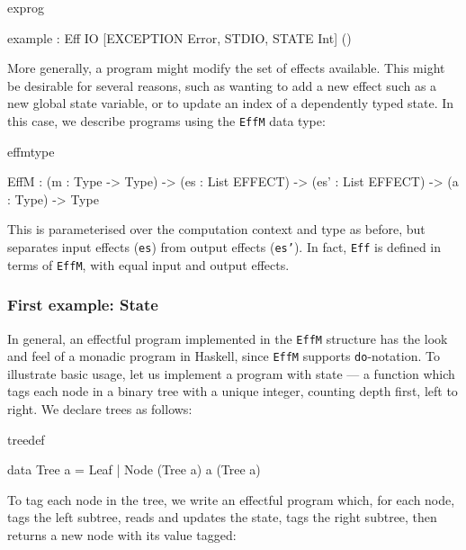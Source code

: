 \noindent
\begin{SaveVerbatim}{exprog}

 example : Eff IO [EXCEPTION Error, STDIO, STATE Int] ()

\end{SaveVerbatim}

More generally, a program might modify the set of effects available. This
might be desirable for several reasons, such as wanting to add a new effect
such as a new global state variable, or to update an index of a dependently
typed state. In this case, we describe programs using the \texttt{EffM}
data type:

\begin{SaveVerbatim}{effmtype}

EffM : (m   : Type -> Type) -> 
       (es  : List EFFECT) -> 
       (es' : List EFFECT) -> 
       (a   : Type) -> Type

\end{SaveVerbatim}

\noindent
This is parameterised over the computation context and type as before, but
separates input effects (\texttt{es}) from output effects (\texttt{es'}).
In fact, \texttt{Eff} is defined in terms of \texttt{EffM}, with equal input
and output effects.

\subsubsection{First example: State}

In general, an effectful program implemented in the \texttt{EffM} structure has
the look and feel of a monadic program in Haskell, since \texttt{EffM} supports
\texttt{do}-notation. To illustrate basic usage, let us implement
a program with state --- a function which tags each node in a binary tree with
a unique integer, counting depth first, left to right. We declare trees as
follows:

\begin{SaveVerbatim}{treedef}

data Tree a = Leaf 
            | Node (Tree a) a (Tree a)

\end{SaveVerbatim}

\noindent
To tag each node in the tree, we write an effectful program which, for each
node, tags the left subtree, reads and updates the state, tags the right
subtree, then returns a new node with its value tagged:

